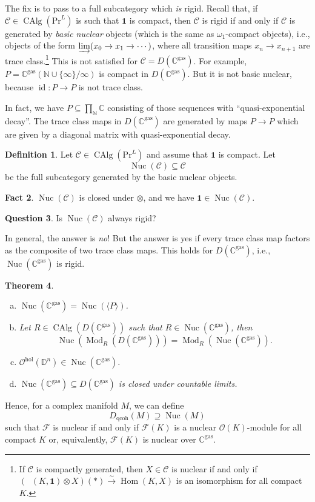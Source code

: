 \documentclass[draft]{amsart}
\newcommand{\NN}{\mathbb{N}}
\newcommand{\DD}{\mathbb{D}}
\newcommand{\CC}{\mathbb{C}}
\renewcommand{\O}{\mathcal{O}}
\newcommand{\ul}[1]{\underline{#1}}
\newcommand{\cat}[1]{\mathcal{#1}}
\newcommand{\sheaf}[1]{\mathcal{#1}}
\newcommand{\isoto}{\mathbin{\xrightarrow{\sim}}}
\renewcommand{\Pr}{\mathrm{Pr}}
\newcommand{\one}{\mathbf{1}}
\DeclareMathOperator{\Hom}{Hom}
\DeclareMathOperator{\id}{id}
\DeclareMathOperator{\CAlg}{CAlg}
\DeclareMathOperator{\iHom}{\ul{Hom}}
\DeclareMathOperator{\Nuc}{Nuc}
\DeclareMathOperator{\Mod}{Mod}
\newtheorem{thm}{Theorem}[section]
\theoremstyle{definition}
\newtheorem{defn}[thm]{Definition}
\newtheorem{question}[thm]{Question}
\newtheorem{fact}[thm]{Fact}
\begin{document}
The fix is to pass to a full subcategory which \emph{is} rigid. Recall that, if $\cat C\in \CAlg(\Pr^L)$ is such that $\one$ is compact, then $\cat C$ is rigid if and only if $\cat C$ is generated by \emph{basic nuclear} objects (which is the same as $\omega_1$-compact objects), i.e., objects of the form $\varinjlim (x_0\to x_1\to \dotsb)$, where all transition maps $x_n\to x_{n+1}$ are trace class.\footnote{If $\cat C$ is compactly generated, then $X\in \cat C$ is nuclear if and only if $(\iHom(K,\one)\otimes X)(*)\isoto \Hom(K,X)$ is an isomorphism for all compact $K$.} This is not satisfied for $\cat C = D(\CC^{\mathrm{gas}})$. For example, $P = \CC^{\mathrm{gas}}(\NN\cup\{\infty\}/\infty)$ is compact in $D(\CC^{\mathrm{gas}})$. But it is not basic nuclear, because $\id\colon P\to P$ is not trace class.

In fact, we have $P\subseteq \prod_{\NN} \CC$ consisting of those sequences with \enquote{quasi-exponential decay}. The trace class maps in $D(\CC^{\mathrm{gas}})$ are generated by maps $P\to P$ which are given by a diagonal matrix with quasi-exponential decay.

\begin{defn}
Let $\cat C \in \CAlg(\Pr^L)$ and assume that $\one$ is compact. Let
\[
\Nuc(\cat C) \subseteq \cat C
\]
be the full subcategory generated by the basic nuclear objects.
\end{defn}

\begin{fact}
$\Nuc(\cat C)$ is closed under $\otimes$, and we have $\one\in \Nuc(\cat C)$.
\end{fact}

\begin{question}
Is $\Nuc(\cat C)$ always rigid?
\end{question}

In general, the answer is \emph{no}! But the answer is yes if every trace class map factors as the composite of two trace class maps. This holds for $D(\CC^{\mathrm{gas}})$, i.e., $\Nuc(\CC^{\mathrm{gas}})$ is rigid.

\begin{thm}
\begin{enumerate}[(a)]
\item $\Nuc(\CC^{\mathrm{gas}}) = \Nuc(\langle P\rangle)$.
\item Let $R\in \CAlg(D(\CC^{\mathrm{gas}}))$ such that $R\in \Nuc(\CC^{\mathrm{gas}})$, then
\[
\Nuc(\Mod_R(D(\CC^{\mathrm{gas}}))) = \Mod_R(\Nuc(\CC^{\mathrm{gas}})).
\]

\item $\O^{\mathrm{hol}}(\DD^n) \in \Nuc(\CC^{\mathrm{gas}})$.
\item $\Nuc(\CC^{\mathrm{gas}}) \subseteq D(\CC^{\mathrm{gas}})$ is closed under countable limits.
\end{enumerate}
\end{thm}

Hence, for a complex manifold $M$, we can define 
\[
D_{\mathrm{qcoh}}(M) \supseteq \Nuc(M)
\]
such that $\sheaf F$ is nuclear if and only if $\sheaf F(K)$ is a nuclear $\O(K)$-module for all compact $K$ or, equivalently, $\sheaf F(K)$ is nuclear over $\CC^{\mathrm{gas}}$.
\end{document}

